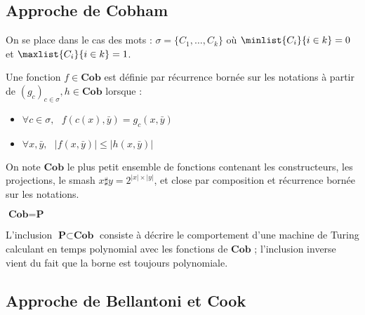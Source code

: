 \documentclass{report}
\begin{document}
		
		\subsection{Approche de Cobham}
		\label{sec:Cobham}
		
			On se place dans le cas des mots : $\sigma = \{ C_1, \dots, C_k \}$ où $\minlist{C_i}{i \in k} = 0$ et $\maxlist{C_i}{i \in k} = 1$.
			
			\begin{definition}
				Une fonction $f \in \textbf{Cob}$ est définie par récurrence bornée sur les notations à partir de $(g_c)_{c \in \sigma}, h \in \textbf{Cob}$ lorsque :
				
				\begin{itemize}[itemsep=-1mm]
					\item 	$\forall c \in \sigma, \:\:\: f\left( c(x), \bar{y} \right) = g_c\left( x, \bar{y} \right)$
					\item 	$\forall x, \bar{y}, \:\:\: \left| f \left( x, \bar{y} \right) \right| \leq \left| h \left( x, \bar{y} \right) \right|$
				\end{itemize}
			\end{definition}
			
			
			\begin{definition}
				\label{def:Cob}
				On note $\textbf{Cob}$ le plus petit ensemble de fonctions contenant les constructeurs, les projections, le smash $x \sharp y = 2^{\left| x \right| \times \left| y\right|}$, et close par composition et récurrence bornée sur les notations.
			\end{definition}
			
			
			\begin{theorem}
				\label{thm:Cob_equals_P}
				$\textbf{Cob} = \textbf{P}$
			\end{theorem}
		
			L'inclusion $\textbf{P} \subset \textbf{Cob}$  consiste à décrire le comportement d'une machine de Turing calculant en temps polynomial avec les fonctions de $\textbf{Cob}$ ; l'inclusion inverse vient du fait que la borne est toujours polynomiale.
			
		
		
		
		\subsection{Approche de Bellantoni et Cook}
			\label{subsec:bellantoni_cook}
		
\end{document}

